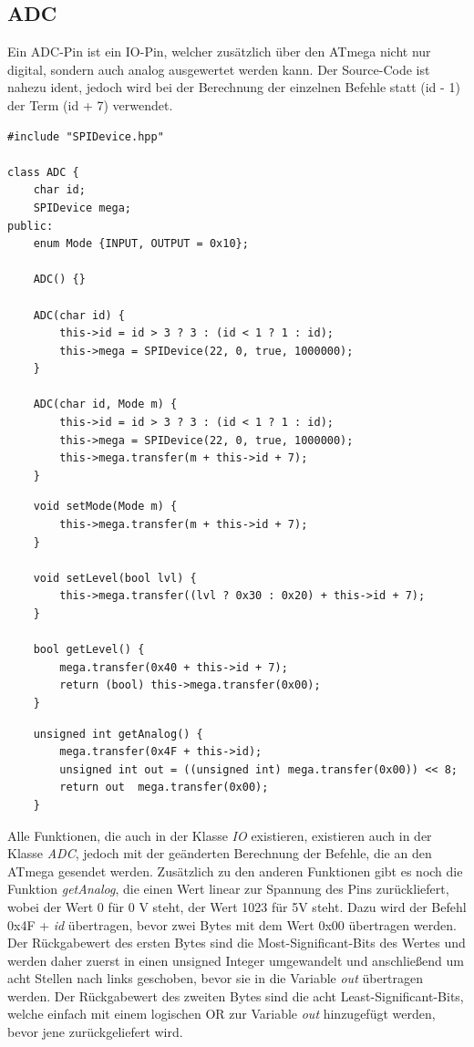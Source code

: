 \documentclass[12pt]{article}
\begin{document}
\subsection{ADC}
Ein ADC-Pin ist ein IO-Pin, welcher zusätzlich über den ATmega nicht nur digital, sondern auch analog ausgewertet werden kann. Der Source-Code ist nahezu ident, jedoch wird bei der Berechnung der einzelnen Befehle statt (id - 1) der Term (id + 7) verwendet.\\
\begin{verbatim}
#include "SPIDevice.hpp"

class ADC {
    char id;
    SPIDevice mega;
public:
    enum Mode {INPUT, OUTPUT = 0x10};

    ADC() {}

    ADC(char id) {
        this->id = id > 3 ? 3 : (id < 1 ? 1 : id);
        this->mega = SPIDevice(22, 0, true, 1000000);
    }

    ADC(char id, Mode m) {
        this->id = id > 3 ? 3 : (id < 1 ? 1 : id);
        this->mega = SPIDevice(22, 0, true, 1000000);
        this->mega.transfer(m + this->id + 7);
    }
\end{verbatim}
\begin{verbatim}
    void setMode(Mode m) {
        this->mega.transfer(m + this->id + 7);
    }

    void setLevel(bool lvl) {
        this->mega.transfer((lvl ? 0x30 : 0x20) + this->id + 7);
    }

    bool getLevel() {
        mega.transfer(0x40 + this->id + 7);
        return (bool) this->mega.transfer(0x00);
    }
\end{verbatim}
\begin{verbatim}
    unsigned int getAnalog() {
        mega.transfer(0x4F + this->id);
        unsigned int out = ((unsigned int) mega.transfer(0x00)) << 8;
        return out  mega.transfer(0x00);
    }
\end{verbatim}
\vspace{-2mm}
Alle Funktionen, die auch in der Klasse \textit{IO} existieren, existieren auch in der Klasse \textit{ADC}, jedoch mit der geänderten Berechnung der Befehle, die an den ATmega gesendet werden. Zusätzlich zu den anderen Funktionen gibt es noch die Funktion \textit{getAnalog}, die einen Wert linear zur Spannung des Pins zurückliefert, wobei der Wert 0 für 0 V steht, der Wert 1023 für 5V steht. Dazu wird der Befehl 0x4F + \textit{id} übertragen, bevor zwei Bytes mit dem Wert 0x00 übertragen werden. Der Rückgabewert des ersten Bytes sind die Most-Significant-Bits des Wertes und werden daher zuerst in einen unsigned Integer umgewandelt und anschließend um acht Stellen nach links geschoben, bevor sie in die Variable \textit{out} übertragen werden. Der Rückgabewert des zweiten Bytes sind die acht Least-Significant-Bits, welche einfach mit einem logischen OR zur Variable \textit{out} hinzugefügt werden, bevor jene zurückgeliefert wird.
\end{document}
